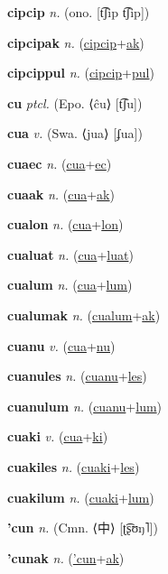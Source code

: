 \textbf{\hypertarget{cipcip}{cipcip}} \textit{n.} (ono. [t͡ʃip t͡ʃip])


\textbf{\hypertarget{cipcipak}{cipcipak}} \textit{n.} (\hyperlink{cipcip}{cipcip}+\allowbreak \hyperlink{ak}{ak})


\textbf{\hypertarget{cipcippul}{cipcippul}} \textit{n.} (\hyperlink{cipcip}{cipcip}+\allowbreak \hyperlink{pul}{pul})


\textbf{\hypertarget{cu}{cu}} \textit{ptcl.} (Epo. ⟨ĉu⟩ [t͡ʃu])


\textbf{\hypertarget{cua}{cua}} \textit{v.} (Swa. ⟨jua⟩ [ʄua])


\textbf{\hypertarget{cuaec}{cuaec}} \textit{n.} (\hyperlink{cua}{cua}+\allowbreak \hyperlink{ec}{ec})


\textbf{\hypertarget{cuaak}{cuaak}} \textit{n.} (\hyperlink{cua}{cua}+\allowbreak \hyperlink{ak}{ak})


\textbf{\hypertarget{cualon}{cualon}} \textit{n.} (\hyperlink{cua}{cua}+\allowbreak \hyperlink{lon}{lon})


\textbf{\hypertarget{cualuat}{cualuat}} \textit{n.} (\hyperlink{cua}{cua}+\allowbreak \hyperlink{luat}{luat})


\textbf{\hypertarget{cualum}{cualum}} \textit{n.} (\hyperlink{cua}{cua}+\allowbreak \hyperlink{lum}{lum})


\textbf{\hypertarget{cualumak}{cualumak}} \textit{n.} (\hyperlink{cualum}{cualum}+\allowbreak \hyperlink{ak}{ak})


\textbf{\hypertarget{cuanu}{cuanu}} \textit{v.} (\hyperlink{cua}{cua}+\allowbreak \hyperlink{nu}{nu})


\textbf{\hypertarget{cuanules}{cuanules}} \textit{n.} (\hyperlink{cuanu}{cuanu}+\allowbreak \hyperlink{les}{les})


\textbf{\hypertarget{cuanulum}{cuanulum}} \textit{n.} (\hyperlink{cuanu}{cuanu}+\allowbreak \hyperlink{lum}{lum})


\textbf{\hypertarget{cuaki}{cuaki}} \textit{v.} (\hyperlink{cua}{cua}+\allowbreak \hyperlink{ki}{ki})


\textbf{\hypertarget{cuakiles}{cuakiles}} \textit{n.} (\hyperlink{cuaki}{cuaki}+\allowbreak \hyperlink{les}{les})


\textbf{\hypertarget{cuakilum}{cuakilum}} \textit{n.} (\hyperlink{cuaki}{cuaki}+\allowbreak \hyperlink{lum}{lum})


\textbf{\hypertarget{'cun}{'cun}} \textit{n.} (Cmn. ⟨{\chinese{}中}⟩ [ʈ͡ʂʊŋ˥])


\textbf{\hypertarget{'cunak}{'cunak}} \textit{n.} (\hyperlink{'cun}{'cun}+\allowbreak \hyperlink{ak}{ak})


